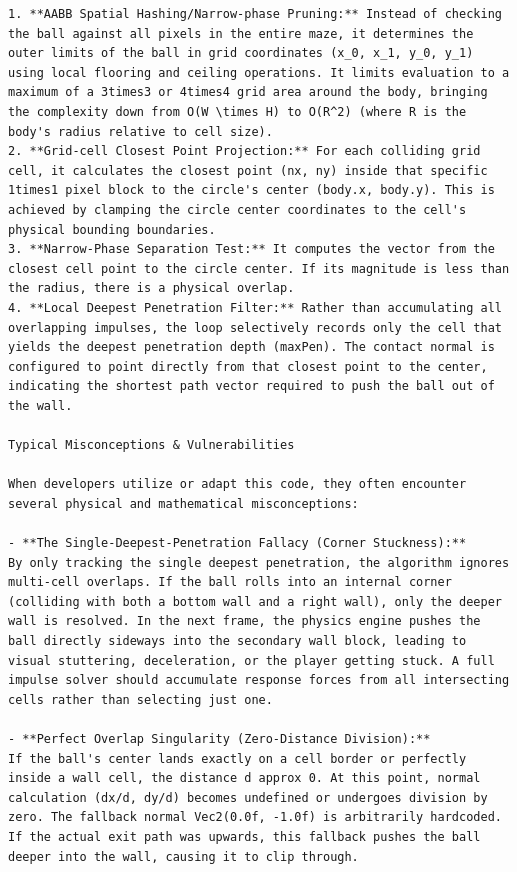 \begin{lstlisting}[language={}, breaklines=true]
1. **AABB Spatial Hashing/Narrow-phase Pruning:** Instead of checking the ball against all pixels in the entire maze, it determines the outer limits of the ball in grid coordinates (x_0, x_1, y_0, y_1) using local flooring and ceiling operations. It limits evaluation to a maximum of a 3times3 or 4times4 grid area around the body, bringing the complexity down from O(W \times H) to O(R^2) (where R is the body's radius relative to cell size).
2. **Grid-cell Closest Point Projection:** For each colliding grid cell, it calculates the closest point (nx, ny) inside that specific 1times1 pixel block to the circle's center (body.x, body.y). This is achieved by clamping the circle center coordinates to the cell's physical bounding boundaries.
3. **Narrow-Phase Separation Test:** It computes the vector from the closest cell point to the circle center. If its magnitude is less than the radius, there is a physical overlap.
4. **Local Deepest Penetration Filter:** Rather than accumulating all overlapping impulses, the loop selectively records only the cell that yields the deepest penetration depth (maxPen). The contact normal is configured to point directly from that closest point to the center, indicating the shortest path vector required to push the ball out of the wall.

Typical Misconceptions & Vulnerabilities

When developers utilize or adapt this code, they often encounter several physical and mathematical misconceptions:

- **The Single-Deepest-Penetration Fallacy (Corner Stuckness):**
By only tracking the single deepest penetration, the algorithm ignores multi-cell overlaps. If the ball rolls into an internal corner (colliding with both a bottom wall and a right wall), only the deeper wall is resolved. In the next frame, the physics engine pushes the ball directly sideways into the secondary wall block, leading to visual stuttering, deceleration, or the player getting stuck. A full impulse solver should accumulate response forces from all intersecting cells rather than selecting just one.

- **Perfect Overlap Singularity (Zero-Distance Division):**
If the ball's center lands exactly on a cell border or perfectly inside a wall cell, the distance d approx 0. At this point, normal calculation (dx/d, dy/d) becomes undefined or undergoes division by zero. The fallback normal Vec2(0.0f, -1.0f) is arbitrarily hardcoded. If the actual exit path was upwards, this fallback pushes the ball deeper into the wall, causing it to clip through.


\end{lstlisting}
